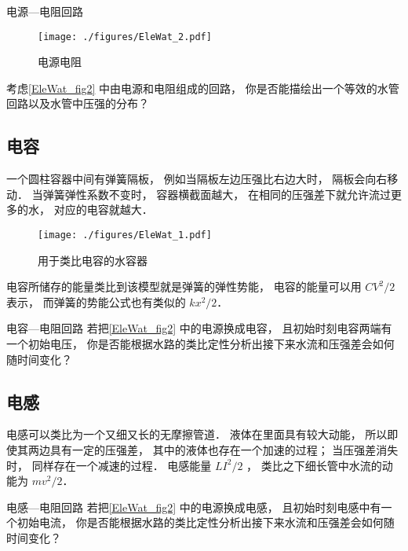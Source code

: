 \begin{exercise}{电源—电阻回路}
\begin{figure}[ht]
\centering
\texttt{[image: ./figures/EleWat\_2.pdf]}
\caption{电源电阻} \label{EleWat_fig2}
\end{figure}
考虑\autoref{EleWat_fig2} 中由电源和电阻组成的回路， 你是否能描绘出一个等效的水管回路以及水管中压强的分布？
\end{exercise}

\subsection{电容}
一个圆柱容器中间有弹簧隔板， 例如当隔板左边压强比右边大时， 隔板会向右移动． 当弹簧弹性系数不变时， 容器横截面越大， 在相同的压强差下就允许流过更多的水， 对应的电容就越大．
\begin{figure}[ht]
\centering
\texttt{[image: ./figures/EleWat\_1.pdf]}
\caption{用于类比电容的水容器} \label{EleWat_fig1}
\end{figure}

电容所储存的能量类比到该模型就是弹簧的弹性势能， 电容的能量可以用 $CV^2/2$ 表示， 而弹簧的势能公式也有类似的 $kx^2/2$．

\begin{exercise}{电容—电阻回路}\label{EleWat_exe1}
若把\autoref{EleWat_fig2} 中的电源换成电容， 且初始时刻电容两端有一个初始电压， 你是否能根据水路的类比定性分析出接下来水流和压强差会如何随时间变化？
\end{exercise}

\subsection{电感}
电感可以类比为一个又细又长的无摩擦管道． 液体在里面具有较大动能， 所以即使其两边具有一定的压强差， 其中的液体也存在一个加速的过程； 当压强差消失时， 同样存在一个减速的过程． 电感能量 $LI^2/2$ ， 类比之下细长管中水流的动能为 $mv^2/2$．

\begin{exercise}{电感—电阻回路}
若把\autoref{EleWat_fig2} 中的电源换成电感， 且初始时刻电感中有一个初始电流， 你是否能根据水路的类比定性分析出接下来水流和压强差会如何随时间变化？
\end{exercise}
